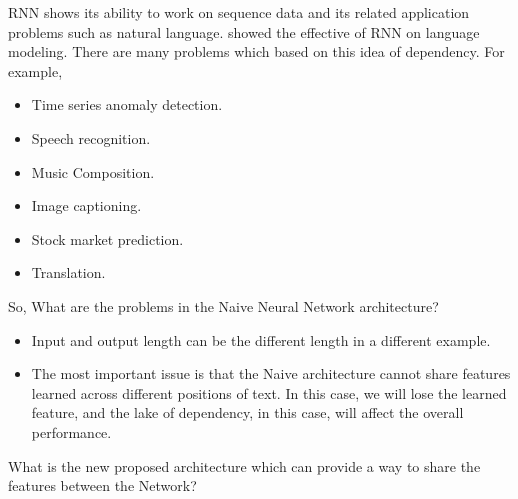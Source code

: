 RNN shows its ability to work on sequence data and its related application problems such as natural language\cite{Mikolov_et_al}. showed the effective of RNN on language modeling. There are many problems which based on this idea of dependency. For example,
\begin{itemize}
\item Time series anomaly detection.
\item Speech recognition.
\item Music Composition.
\item Image captioning.
\item Stock market prediction.
\item Translation.
\end{itemize}
So, What are the problems in the Naive Neural Network architecture?
\begin{itemize}
\item Input and output length can be the different length in a different example.
\item The most important issue is that the Naive architecture cannot share features learned across different positions of text. In this case, we will lose the learned feature, and the lake of dependency, in this case, will affect the overall performance.
\end{itemize}
What is the new proposed architecture which can provide a way to share the features between the Network?
